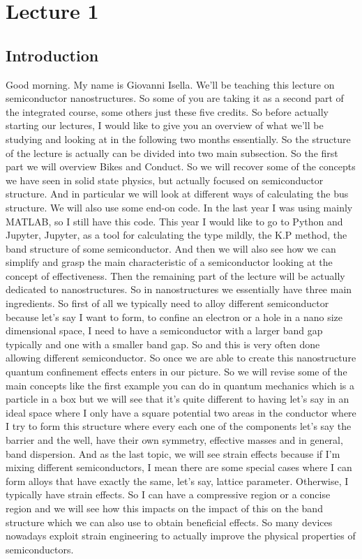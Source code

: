 \chapter{Lecture 1}
\section{Introduction}
Good morning. My name is Giovanni Isella. We'll be teaching this lecture on semiconductor nanostructures. So some of you are taking it as a second part of the integrated course, some others just these five credits. So before actually starting our lectures, I would like to give you an overview of what we'll be studying and looking at in the following two months essentially. So the structure of the lecture is actually can be divided into two main subsection. So the first part we will overview Bikes and Conduct. So we will recover some of the concepts we have seen in solid state physics, but actually focused on semiconductor structure. And in particular we will look at different ways of calculating the bus structure. We will also use some end-on code. In the last year I was using mainly MATLAB, so I still have this code. This year I would like to go to Python and Jupyter, Jupyter, as a tool for calculating the type mildly, the K.P method, the band structure of some semiconductor. And then we will also see how we can simplify and grasp the main characteristic of a semiconductor looking at the concept of effectiveness. Then the remaining part of the lecture will be actually dedicated to nanostructures. So in nanostructures we essentially have three main ingredients. So first of all we typically need to alloy different semiconductor because let's say I want to form, to confine an electron or a hole in a nano size dimensional space, I need to have a semiconductor with a larger band gap typically and one with a smaller band gap. So and this is very often done allowing different semiconductor. So once we are able to create this nanostructure quantum confinement effects enters in our picture. So we will revise some of the main concepts like the first example you can do in quantum mechanics which is a particle in a box but we will see that it's quite different to having let's say in an ideal space where I only have a square potential two areas in the conductor where I try to form this structure where every each one of the components let's say the barrier and the well, have their own symmetry, effective masses and in general, band dispersion. And as the last topic, we will see strain effects because if I'm mixing different semiconductors, I mean there are some special cases where I can form alloys that have exactly the same, let's say, lattice parameter. Otherwise, I typically have strain effects. So I can have a compressive region or a concise region and we will see how this impacts on the impact of this on the band structure which we can also use to obtain beneficial effects. So many devices nowadays exploit strain engineering to actually improve the physical properties of semiconductors.
